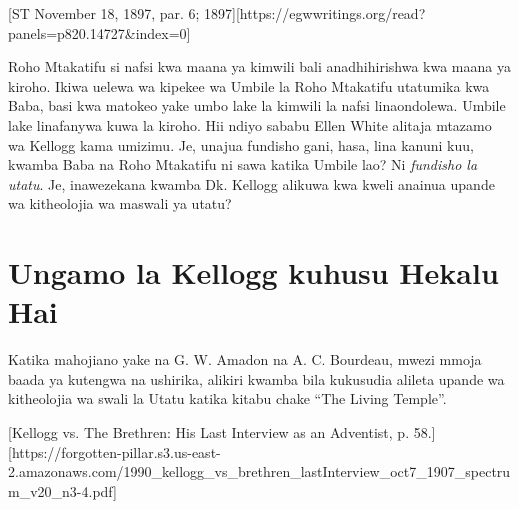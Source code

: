 [ST November 18, 1897, par. 6; 1897][https://egwwritings.org/read?panels=p820.14727&index=0]

Roho Mtakatifu si nafsi kwa maana ya kimwili bali anadhihirishwa kwa maana ya kiroho. Ikiwa uelewa wa kipekee wa Umbile la Roho Mtakatifu utatumika kwa Baba, basi kwa matokeo yake umbo lake la kimwili la nafsi linaondolewa. Umbile lake linafanywa kuwa la kiroho. Hii ndiyo sababu Ellen White alitaja mtazamo wa Kellogg kama umizimu. Je, unajua fundisho gani, hasa, lina kanuni kuu, kwamba Baba na Roho Mtakatifu ni sawa katika Umbile lao? Ni \textit{fundisho la utatu}. Je, inawezekana kwamba Dk. Kellogg alikuwa kwa kweli anainua upande wa kitheolojia wa maswali ya utatu?

\section*{Ungamo la Kellogg kuhusu Hekalu Hai}

Katika mahojiano yake na G. W. Amadon na A. C. Bourdeau, mwezi mmoja baada ya kutengwa na ushirika, alikiri kwamba bila kukusudia alileta upande wa kitheolojia wa swali la Utatu katika kitabu chake “The Living Temple”.

[Kellogg vs. The Brethren: His Last Interview as an Adventist, p. 58.][https://forgotten-pillar.s3.us-east-2.amazonaws.com/1990\_kellogg\_vs\_brethren\_lastInterview\_oct7\_1907\_spectrum\_v20\_n3-4.pdf]

